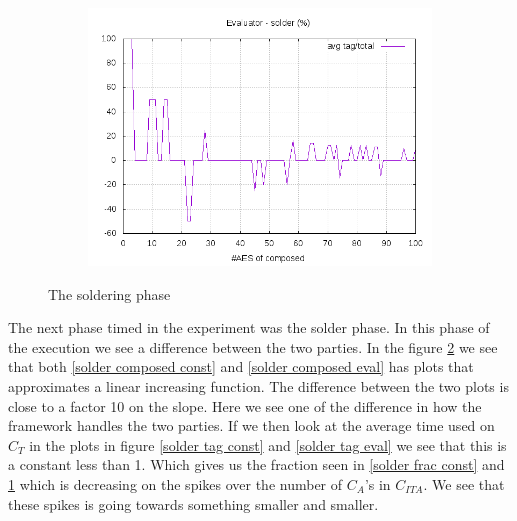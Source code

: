 \documentclass[10pt,a4paper]{article}
\begin{document}
\begin{figure}[h]
\begin{subfigure}[t]{0.3\textwidth}
        \includegraphics[width=\textwidth]{eval_solder_frac}
        \caption{}
        \label{solder frac eval}
    \end{subfigure}
    \caption{The soldering phase}
    \label{solder}
\end{figure}

The next phase timed in the experiment was the solder phase.
In this phase of the execution we see a difference between the two parties. In the figure \ref{solder} we see that both \ref{solder composed const} and \ref{solder composed eval} has plots that approximates a linear increasing function. The difference between the two plots is close to a factor 10 on the slope. Here we see one of the difference in how the framework handles the two parties. If we then look at the average time used on $C_T$ in the plots in figure \ref{solder tag const} and \ref{solder tag eval} we see that this is a constant less than 1. Which gives us the fraction seen in \ref{solder frac const} and \ref{solder frac eval} which is decreasing on the spikes over the number of $C_A$'s in $C_{ITA}$. We see that these spikes is going towards something smaller and smaller.
\end{document}
